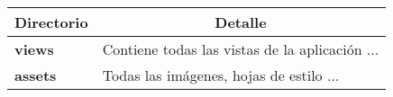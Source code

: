 \begin{center}
  \begin{tabular}{ | l | p{12.5cm} |}
    \hline
    \multicolumn{1}{|c|}{\textbf{Directorio}} & \multicolumn{1}{|c|}{\textbf{Detalle}} \\
    \hline
    
    {\textbf{views}} & Contiene todas las vistas de la aplicación ... \\ \hline
    
    {\textbf{assets}} & Todas las imágenes, hojas de estilo ... \\ \hline
  \end{tabular}
  
  \label{table:frontend}
\end{center}
